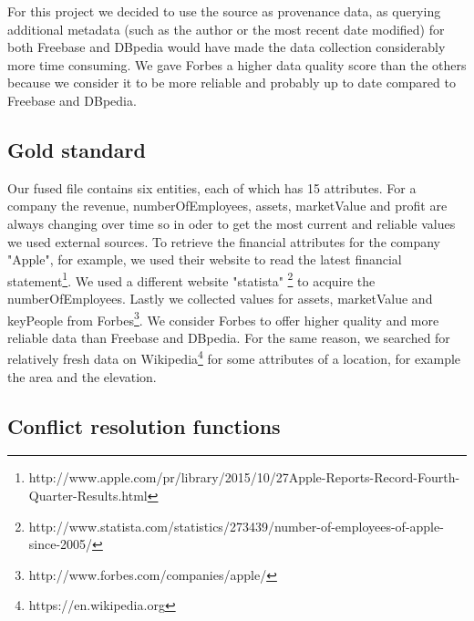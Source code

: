 

For this project we decided to use the source as provenance data, as querying additional metadata (such as the author or the most recent date modified) for both Freebase and DBpedia would have made the data collection considerably more time consuming. We gave Forbes a higher data quality score than the others because we consider it to be more reliable and probably up to date compared to Freebase and DBpedia.




\subsection{Gold standard}
Our fused file contains six entities, each of which has 15 attributes. For a company the revenue, numberOfEmployees, assets, marketValue and profit are always changing over time so in oder to get the most current and reliable values we used external sources. To retrieve the financial attributes for the company "Apple", for example, we used their website to read the latest financial statement\footnote{http://www.apple.com/pr/library/2015/10/27Apple-Reports-Record-Fourth-Quarter-Results.html}. We used a different website "statista" \footnote{http://www.statista.com/statistics/273439/number-of-employees-of-apple-since-2005/} to acquire the numberOfEmployees. Lastly we collected values for assets, marketValue and keyPeople from Forbes\footnote{http://www.forbes.com/companies/apple/}. We consider Forbes to offer higher quality and more reliable data than Freebase and DBpedia. For the same reason, we searched for relatively fresh data on Wikipedia\footnote{https://en.wikipedia.org} for some attributes of a location, for example the area and the elevation. 

 

\subsection{Conflict resolution functions}

